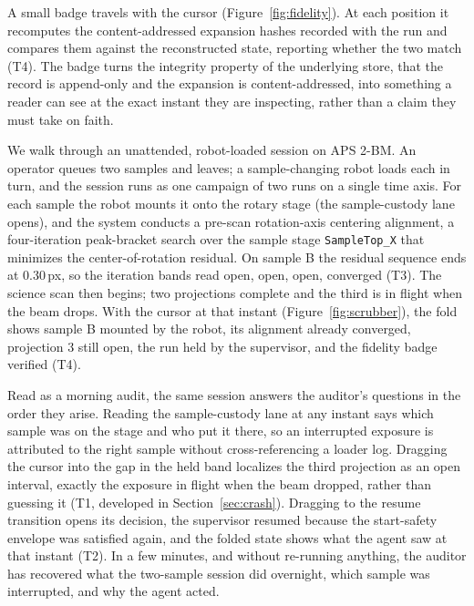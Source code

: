 A small badge travels with the cursor (Figure~\ref{fig:fidelity}). At each
position it recomputes the content-addressed expansion hashes recorded with the
run and compares them against the reconstructed state, reporting whether the two
match (T4). The badge
turns the integrity property of the underlying store, that the record is
append-only and the expansion is content-addressed, into something a reader can
see at the exact instant they are inspecting, rather than a claim they must take
on faith.

We walk through an unattended, robot-loaded session on APS 2-BM. An operator
queues two samples and leaves; a sample-changing robot loads each in turn, and
the session runs as one campaign of two runs on a single time axis. For each
sample the robot mounts it onto the rotary stage (the sample-custody lane opens),
and the system conducts a pre-scan rotation-axis centering alignment, a
four-iteration peak-bracket search over the sample stage \texttt{SampleTop\_X}
that minimizes the center-of-rotation residual. On sample B the residual sequence
ends at $0.30$\,px, so the iteration bands read open, open, open, converged (T3).
The science scan then begins; two projections complete and the third is in flight
when the beam drops. With the cursor at that instant (Figure~\ref{fig:scrubber}),
the fold shows sample B mounted by the robot, its alignment already converged,
projection 3 still open, the run held by the supervisor, and the fidelity badge
verified (T4).

Read as a morning audit, the same session answers the auditor's questions in the
order they arise. Reading the sample-custody lane at any instant says which
sample was on the stage and who put it there, so an interrupted exposure is
attributed to the right sample without cross-referencing a loader log. Dragging
the cursor into the gap in the held band localizes the third projection as an
open interval, exactly the exposure in flight when the beam dropped, rather than
guessing it (T1, developed in Section~\ref{sec:crash}). Dragging to the resume
transition opens its decision, the supervisor resumed because the start-safety
envelope was satisfied again, and the folded state shows what the agent saw at
that instant (T2). In a few minutes, and without re-running anything, the auditor
has recovered what the two-sample session did overnight, which sample was
interrupted, and why the agent acted.

